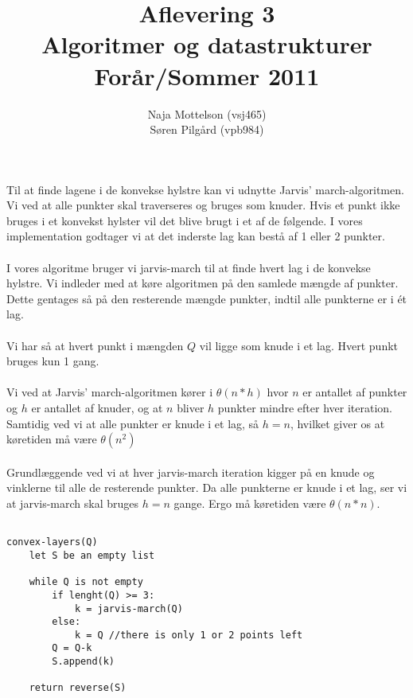 \documentclass[10pt,a4paper,danish]{article}
\title{Aflevering 3 \\Algoritmer og datastrukturer\\Forår/Sommer 2011}
\author{Naja Mottelson (vsj465)\\Søren Pilgård (vpb984)}
\begin{document}
\maketitle
\newpage


\section{}
Til at finde lagene i de konvekse hylstre kan vi udnytte Jarvis' march-algoritmen.
Vi ved at alle punkter skal traverseres og bruges som knuder. Hvis et punkt ikke bruges
i et konvekst hylster vil det blive brugt i et af de følgende. I vores implementation
godtager vi at det inderste lag kan bestå af 1 eller 2 punkter. 

\paragraph{}
I vores algoritme bruger vi jarvis-march til at finde hvert lag i de konvekse hylstre. Vi 
indleder med at køre algoritmen på den samlede mængde af punkter. Dette gentages så på den
resterende mængde punkter, indtil alle punkterne er i ét lag.

\paragraph{}
Vi har så at hvert punkt i mængden $Q$ vil ligge som knude i et lag. Hvert punkt bruges kun 1 gang.

\paragraph{}
Vi ved at Jarvis' march-algoritmen kører i $\theta(n*h)$ hvor $n$ er antallet af punkter og $h$ er
antallet af knuder, og at $n$ bliver $h$ punkter mindre efter hver iteration. Samtidig ved vi at
alle punkter er knude i et lag, så  $h = n$, hvilket giver os at køretiden må være $\theta(n^2)$

\paragraph{}
Grundlæggende ved vi at hver jarvis-march iteration kigger på en knude og vinklerne til alle de 
resterende punkter. Da alle punkterne er knude i et lag, ser vi at jarvis-march skal bruges $h = n$ 
gange. Ergo må køretiden være $\theta(n*n)$. 


\begin{verbatim}

convex-layers(Q)
    let S be an empty list

    while Q is not empty
        if lenght(Q) >= 3:
            k = jarvis-march(Q)
        else:
            k = Q //there is only 1 or 2 points left
        Q = Q-k
        S.append(k)

    return reverse(S)
\end{verbatim}
\end{document}
